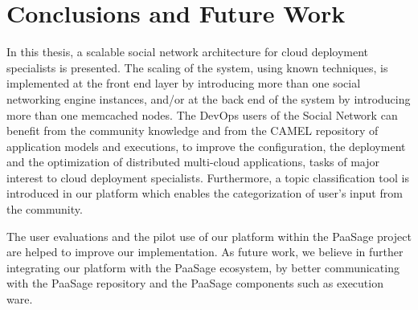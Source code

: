 \chapter{Conclusions and Future Work}
\label{sec:conclusions}
In this thesis, a scalable social network architecture for cloud deployment specialists is presented. The scaling of the system, using known techniques, is implemented at the front end layer by introducing more than one social networking engine instances, and/or at the back end of the system by introducing more than one memcached nodes. 
The DevOps users of the Social Network can benefit from the community knowledge and from the CAMEL repository of application models and executions, to improve the configuration, the deployment and the optimization of distributed multi-cloud applications, tasks of major interest to cloud deployment specialists. 
Furthermore, a topic classification tool is introduced in our platform which enables the categorization of user's input from the community. 

The user evaluations and the pilot use of our platform within the PaaSage project are helped to improve our implementation. As future work, we believe in further integrating our platform with the PaaSage ecosystem, by better communicating with the PaaSage repository and the PaaSage components such as execution ware. 
 